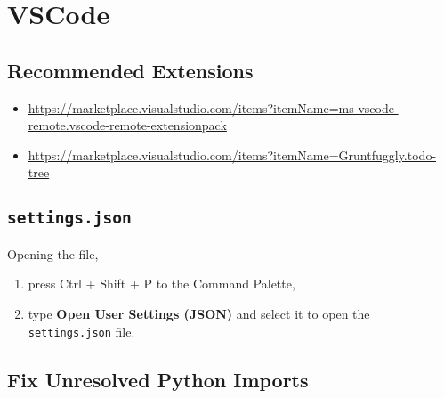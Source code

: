 \documentclass[12pt, a4paper]{article}
\numberwithin{equation}{section}
\theoremstyle{definition}
\theoremstyle{definition}
\begin{document}
\newpage 

\section{VSCode}

	\subsection{Recommended Extensions}
	
		\begin{itemize}
					
			\item  \url{https://marketplace.visualstudio.com/items?itemName=ms-vscode-remote.vscode-remote-extensionpack}
		
			\item \url{https://marketplace.visualstudio.com/items?itemName=Gruntfuggly.todo-tree}
		
		\end{itemize}	

	\subsection{\texttt{settings.json}}\label{app:open_settings_file_vs}
		Opening the file,
		
		\begin{enumerate}
			\item press Ctrl + Shift + P to the Command Palette, 
			\item type \textbf{Open User Settings (JSON)} and select it to open the \texttt{settings.json} file.
		\end{enumerate}


	\subsection{Fix Unresolved Python Imports}
	
\end{document}
